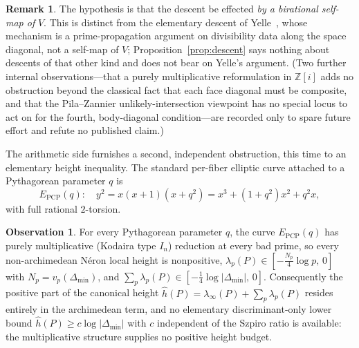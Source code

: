 \documentclass[11pt,reqno]{amsart}
\theoremstyle{plain}
\theoremstyle{definition}
\newtheorem{observation}[theorem]{Observation}
\newtheorem{remark}[theorem]{Remark}
\newcommand{\Z}{\mathbb{Z}}
\begin{document}
\begin{remark}\label{rem:yelle}
The hypothesis is that the descent be effected \emph{by a birational self-map of}
$V$. This is distinct from the elementary descent of
Yelle~\cite{Yelle}, whose mechanism is a prime-propagation argument on
divisibility data along the space diagonal, not a self-map of $V$;
Proposition~\ref{prop:descent} says nothing about descents of that other kind and
does not bear on Yelle's argument. (Two further internal observations---that a
purely multiplicative reformulation in $\Z[i]$ adds no obstruction beyond the
classical fact that each face diagonal must be composite, and that the
Pila--Zannier unlikely-intersection viewpoint has no special locus to act on for
the fourth, body-diagonal condition---are recorded only to spare future effort and
refute no published claim.)
\end{remark}

The arithmetic side furnishes a second, independent obstruction, this time to an
elementary height inequality. The standard per-fiber elliptic curve attached to a
Pythagorean parameter $q$ is
\[
E_{\mathrm{PCP}}(q):\quad y^2=x(x+1)(x+q^2)=x^3+(1+q^2)x^2+q^2x ,
\]
with full rational $2$-torsion.

\begin{observation}\label{obs:noabs}
For every Pythagorean parameter $q$, the curve $E_{\mathrm{PCP}}(q)$ has purely
multiplicative (Kodaira type $I_n$) reduction at every bad prime, so every
non-archimedean N\'eron local height is nonpositive,
$\lambda_p(P)\in[-\tfrac{N_p}{4}\log p,\,0]$ with $N_p=v_p(\Delta_{\min})$, and
$\sum_p\lambda_p(P)\in[-\tfrac14\log|\Delta_{\min}|,\,0]$. Consequently the
positive part of the canonical height
$\widehat h(P)=\lambda_\infty(P)+\sum_p\lambda_p(P)$ resides entirely in the
archimedean term, and no elementary discriminant-only lower bound
$\widehat h(P)\ge c\log|\Delta_{\min}|$ with $c$ independent of the Szpiro ratio
is available: the multiplicative structure supplies no positive height budget.
\end{observation}
\end{document}
